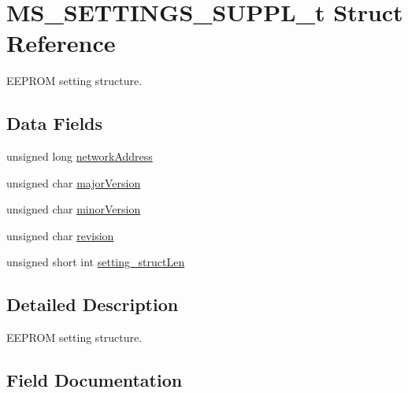 \hypertarget{struct_m_s___s_e_t_t_i_n_g_s___s_u_p_p_l__t}{}\section{M\+S\+\_\+\+S\+E\+T\+T\+I\+N\+G\+S\+\_\+\+S\+U\+P\+P\+L\+\_\+t Struct Reference}
\label{struct_m_s___s_e_t_t_i_n_g_s___s_u_p_p_l__t}


E\+E\+P\+R\+OM setting structure.  


\subsection*{Data Fields}
\begin{DoxyCompactItemize}
\item 
unsigned long \hyperlink{struct_m_s___s_e_t_t_i_n_g_s___s_u_p_p_l__t_aff8093810fd27a53fc13f58c12d5822e}{network\+Address}
\item 
unsigned char \hyperlink{struct_m_s___s_e_t_t_i_n_g_s___s_u_p_p_l__t_ab4d6d53b3f3d6e15cbc895048c8a0be8}{major\+Version}
\item 
unsigned char \hyperlink{struct_m_s___s_e_t_t_i_n_g_s___s_u_p_p_l__t_a1a92b6a7e593b2cc33170738ce922bb4}{minor\+Version}
\item 
unsigned char \hyperlink{struct_m_s___s_e_t_t_i_n_g_s___s_u_p_p_l__t_af3d9265da105cdb5ac5f2544580aee19}{revision}
\item 
unsigned short int \hyperlink{struct_m_s___s_e_t_t_i_n_g_s___s_u_p_p_l__t_a41c4ce6120b5d5cad4345ea11c7fb9f8}{setting\+\_\+struct\+Len}
\end{DoxyCompactItemize}


\subsection{Detailed Description}
E\+E\+P\+R\+OM setting structure. 

\subsection{Field Documentation}
\mbox{\label{struct_m_s___s_e_t_t_i_n_g_s___s_u_p_p_l__t_ab4d6d53b3f3d6e15cbc895048c8a0be8}} 
